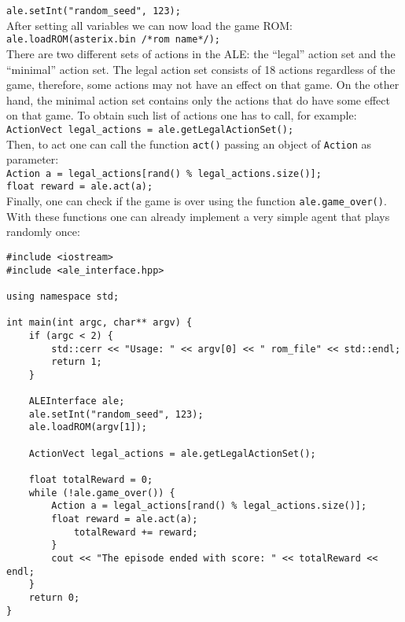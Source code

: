 \documentclass[12pt]{article}
\begin{document}
\verb+ale.setInt("random_seed", 123);+\\

After setting all variables we can now load the game ROM:\\

\verb+ale.loadROM(asterix.bin /*rom name*/);+\\

There are two different sets of actions in the ALE: the ``legal'' action set and the ``minimal'' 
action set. The legal action set consists of 18 actions regardless of the game, therefore, some 
actions may not have an effect on that game. On the other hand, the minimal action set contains only 
the actions that do have some effect on that game. To obtain such list of actions one has to call, for
example:\\

\verb+ActionVect legal_actions = ale.getLegalActionSet();+\\

Then, to act one can call the function \verb+act()+ passing an object of \verb+Action+ as parameter:\\

\verb+Action a = legal_actions[rand() % legal_actions.size()];+\\
\indent \verb+float reward = ale.act(a);+\\

Finally, one can check if the game is over using the function \verb+ale.game_over()+. With these 
functions one can already implement a very simple agent that plays randomly once:

\begin{verbatim}
#include <iostream>
#include <ale_interface.hpp>

using namespace std;

int main(int argc, char** argv) {
    if (argc < 2) {
        std::cerr << "Usage: " << argv[0] << " rom_file" << std::endl;
        return 1;
    }

    ALEInterface ale;
    ale.setInt("random_seed", 123);
    ale.loadROM(argv[1]);

    ActionVect legal_actions = ale.getLegalActionSet();
    
    float totalReward = 0;
    while (!ale.game_over()) {
        Action a = legal_actions[rand() % legal_actions.size()];    
        float reward = ale.act(a);
            totalReward += reward;
        }
        cout << "The episode ended with score: " << totalReward << endl;
    }
    return 0;
}
\end{verbatim}
\end{document}
